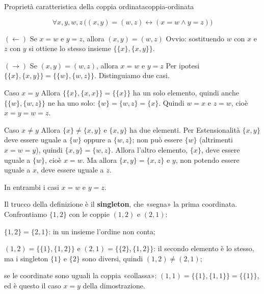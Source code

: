 \begin{concetto}
\begin{Teorema}{Proprietà caratteristica della coppia ordinata}{coppia-ordinata}
    \begin{prerequisiti}
    \end{prerequisiti}
    \[ \forall x, y, w, z\,\big((x, y) = (w, z) \leftrightarrow (x = w \wedge y = z)\big) \]
\end{Teorema}
\begin{dimostrazione}
    \begin{caso}{$(\leftarrow)$ Se $x = w$ e $y = z$, allora $(x, y) = (w, z)$}
        Ovvio: sostituendo $w$ con $x$ e $z$ con $y$ si ottiene lo stesso insieme $\{\{x\}, \{x, y\}\}$.
    \end{caso}
    \begin{caso}{$(\rightarrow)$ Se $(x, y) = (w, z)$, allora $x = w$ e $y = z$}
        Per ipotesi $\{\{x\}, \{x, y\}\} = \{\{w\}, \{w, z\}\}$. Distinguiamo due casi.
        \begin{caso}{Caso $x = y$}
            Allora $\{\{x\}, \{x, x\}\} = \{\{x\}\}$ ha un solo elemento, quindi anche $\{\{w\}, \{w, z\}\}$ ne ha uno solo:
            $\{w\} = \{w, z\} = \{x\}$. Quindi $w = x$ e $z = w$, cioè $x = y = w = z$.
        \end{caso}
        \begin{caso}{Caso $x \neq y$}
            Allora $\{x\} \neq \{x, y\}$ e $\{x, y\}$ ha due elementi. Per Estensionalità $\{x, y\}$ deve essere uguale a
            $\{w\}$ oppure a $\{w, z\}$; non può essere $\{w\}$ (altrimenti $x = w = y$), quindi $\{x, y\} = \{w, z\}$.
            Allora l'altro elemento, $\{x\}$, deve essere uguale a $\{w\}$, cioè $x = w$. Ma allora $\{x, y\} = \{x, z\}$
            e $y$, non potendo essere uguale a $x$, deve essere uguale a $z$.
        \end{caso}
        In entrambi i casi $x = w$ e $y = z$.
    \end{caso}
\end{dimostrazione}
\end{concetto}

\begin{spiegazione}
    Il trucco della definizione è il \textbf{singleton}, che «segna» la prima coordinata. Confrontiamo $\{1, 2\}$ con le coppie $(1, 2)$ e $(2, 1)$:
    \begin{passi}
        \item $\{1, 2\} = \{2, 1\}$: in un insieme l'ordine non conta;
        \item $(1, 2) = \{\{1\}, \{1, 2\}\}$ e $(2, 1) = \{\{2\}, \{1, 2\}\}$: il secondo elemento è lo stesso, ma i singleton $\{1\}$ e $\{2\}$ sono diversi,
              quindi $(1, 2) \neq (2, 1)$;
        \item se le coordinate sono uguali la coppia «collassa»: $(1, 1) = \{\{1\}, \{1, 1\}\} = \{\{1\}\}$, ed è questo il caso $x = y$ della dimostrazione.
    \end{passi}
\end{spiegazione}


